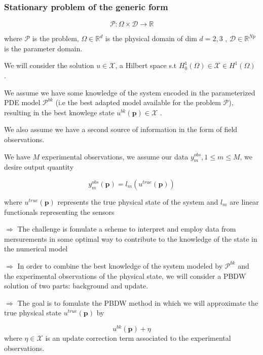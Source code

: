 \documentclass[a4paper,10pt]{beamer}
\numberwithin{equation}{section}
\begin{document}
\begin{frame}
\frametitle{Stationary problem of the generic form}

\begin{equation}
\mathcal{P} : \Omega \times \mathcal{D} \rightarrow \mathbb{R}
\end{equation}

where $\mathcal{P}$ is the problem, $\Omega \in \mathbb{R}^d$ is the physical domain of dim $d = 2,3$ , $\mathcal{D} \in \mathbb{R}^{Np}$ is the parameter domain.

We will consider the solution $u \in \mathcal{X}$, a Hilbert space s.t $H^1_0(\Omega) \in \mathcal{X} \in H^1(\Omega)$ .


We assume we have some knowledge of the system encoded in the parameterized PDE model $\mathcal{P}^{bk}$ (i.e the best adapted model available for the problem $\mathcal{P}$), resulting in the best knowlege state $u^{bk}(\textbf{p}) \in \mathcal{X}$ .
\end{frame}


\begin{frame}
We also assume we have a second source of information in the form of field observations.

We have $M$ experimental observations, we assume our data $y^{obs}_m, 1 \leq m \leq M$, we desire output quantity

\begin{equation}
y_m^{obs}(\textbf{p}) = l_m(u^{true}(\textbf{p}))
\end{equation}

where $u^{true}(\textbf{p})$ represents the true physical state of the system and $l_m$ are linear functionals representing the sensors

\end{frame}


\begin{frame}
$\Rightarrow$ The challenge is fomulate a scheme to interpret and employ data from mersurements in some optimal way to contribute to the knowledge of the state in the numerical model

$\Rightarrow$ In order to combine the best knowledge of the system modeled by $\mathcal{P}^{bk}$ and the experimental observations of the physical state, we will consider a PBDW solution of two parts: background and update.

$\Rightarrow$ The goal is to fomulate the PBDW method in which we will approximate the true physical state $u^{true}(\textbf{p})$ by 

\begin{equation}
u^{bk}(\textbf{p}) + \eta
\end{equation}
where $\eta \in \mathcal{X}$ is an update correction term associated to the experimental observations. 

\end{frame}
\end{document}
